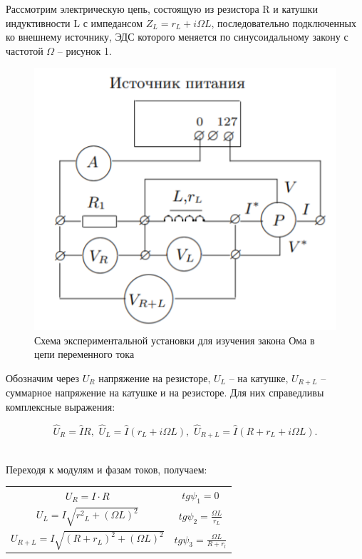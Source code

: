 \documentclass[a4paper, fontsize = 14pt]{article}
\begin{document}
Рассмотрим электрическую цепь, состоящую из резистора R и катушки индуктивности L с импедансом $Z_L = r_L + i\Omega L$, последовательно подключенных ко внешнему источнику, ЭДС которого меняется по синусоидальному закону с частотой $\Omega$ -- рисунок 1.

\begin{figure}[hbt]
	\centering
	\includegraphics[scale=1]{lab48ris1.png}
	\caption{Схема экспериментальной установки для изучения закона Ома в цепи переменного тока}
\end{figure}

Обозначим через $U_R$ напряжение на резисторе, $U_L$ -- на катушке, $U_{R+L}$ -- суммарное напряжение на катушке и на резисторе. Для них справедливы комплексные выражения:

\begin{equation}
	\hat{U}_R = \hat{I} R, \,\, \hat{U}_L = \hat{I}(r_L + i\Omega L), \,\, \hat{U}_{R+L} = \hat{I}(R + r_L + i\Omega L).
\end{equation}

\text{ } \\ 

Переходя к модулям и фазам токов, получаем:

\begin{table}[hbt]
\centering
\begin{tabular}{cc}
$U_R = I \cdot R$                              & $tg \psi_1 = 0$                        \\
$U_L = I \sqrt{{r^2}_L+(\Omega L)^2}$         & $tg \psi_2 = \frac{\Omega L}{r_L}$     \\
$U_{R+L} = I \sqrt{(R+r_L)^2 + (\Omega L)^2}$ & $tg \psi_3 = \frac{\Omega L}{R + r_l}$
\end{tabular}
\end{table}
\end{document}
